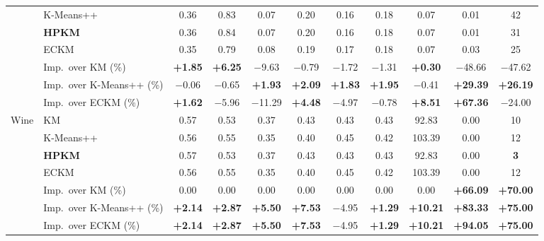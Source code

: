 \begin{table}[p]
\begin{adjustbox}{max width=\textwidth, max totalheight=0.86\textheight}
\begin{tabular}{|c|l|ccccccccc|}
 & K-Means++ & 0.36 & 0.83 & 0.07 & 0.20 & 0.16 & 0.18 & 0.07 & 0.01 & 42 \\
 & \textbf{HPKM} & 0.36 & 0.84 & 0.07 & 0.20 & 0.16 & 0.18 & 0.07 & 0.01 & 31 \\
 & ECKM & 0.35 & 0.79 & 0.08 & 0.19 & 0.17 & 0.18 & 0.07 & 0.03 & 25 \\
& Imp.\ over KM (\%) & \textbf{+1.85} & \textbf{+6.25} & $-$9.63 & $-$0.79 & $-$1.72 & $-$1.31 & \textbf{+0.30} & $-$48.66 & $-$47.62 \\
& Imp.\ over K-Means++ (\%) & $-$0.06 & $-$0.65 & \textbf{+1.93} & \textbf{+2.09} & \textbf{+1.83} & \textbf{+1.95} & $-$0.41 & \textbf{+29.39} & \textbf{+26.19} \\
& Imp.\ over ECKM (\%) & \textbf{+1.62} & $-$5.96 & $-$11.29 & \textbf{+4.48} & $-$4.97 & $-$0.78 & \textbf{+8.51} & \textbf{+67.36} & $-$24.00 \\
\hline
Wine & KM & 0.57 & 0.53 & 0.37 & 0.43 & 0.43 & 0.43 & 92.83 & 0.00 & 10 \\
 & K-Means++ & 0.56 & 0.55 & 0.35 & 0.40 & 0.45 & 0.42 & 103.39 & 0.00 & 12 \\
 & \textbf{HPKM} & 0.57 & 0.53 & 0.37 & 0.43 & 0.43 & 0.43 & 92.83 & 0.00 & \textbf{3} \\
 & ECKM & 0.56 & 0.55 & 0.35 & 0.40 & 0.45 & 0.42 & 103.39 & 0.00 & 12 \\
& Imp.\ over KM (\%) & 0.00 & 0.00 & 0.00 & 0.00 & 0.00 & 0.00 & 0.00 & \textbf{+66.09} & \textbf{+70.00} \\
& Imp.\ over K-Means++ (\%) & \textbf{+2.14} & \textbf{+2.87} & \textbf{+5.50} & \textbf{+7.53} & $-$4.95 & \textbf{+1.29} & \textbf{+10.21} & \textbf{+83.33} & \textbf{+75.00} \\
& Imp.\ over ECKM (\%) & \textbf{+2.14} & \textbf{+2.87} & \textbf{+5.50} & \textbf{+7.53} & $-$4.95 & \textbf{+1.29} & \textbf{+10.21} & \textbf{+94.05} & \textbf{+75.00} \\
\hline
\end{tabular}
\end{adjustbox}
\end{table}
